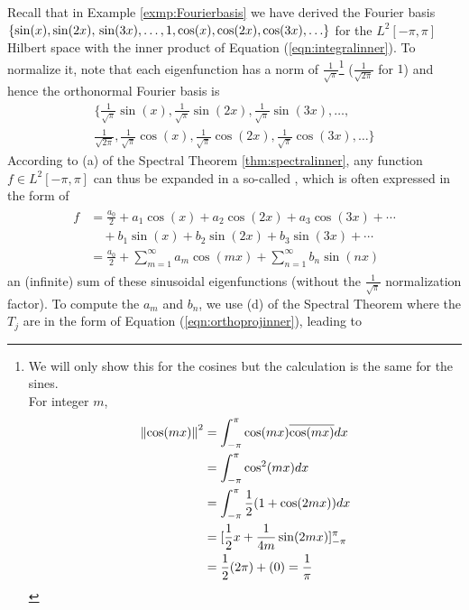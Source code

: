 Recall that in Example \ref{exmp:Fourierbasis} we have derived the Fourier basis $\{\sin(x), \sin(2x), \\ \sin(3x), \ldots, 1, \cos(x), \cos(2x), \cos(3x), \ldots\}$ for the $L^2[-\pi, \pi]$ Hilbert space with the inner product of Equation (\ref{eqn:integralinner}). To normalize it, note that each eigenfunction has a norm of $\frac{1}{\sqrt{\pi}}$\footnote{We will only show this for the cosines but the calculation is the same for the sines. \\For integer $m$,
\begin{align*}
\norm{\cos(mx)}^2 &= \int_{-\pi}^{\pi} \cos(mx)\overline{\cos(mx)} dx \\
&= \int_{-\pi}^{\pi} \cos^2(mx) dx \\
&= \int_{-\pi}^{\pi} \frac{1}{2}(1 + \cos(2mx)) dx \\
&= [\frac{1}{2}x + \frac{1}{4m}\sin(2mx)]_{-\pi}^{\pi} \\
&= \frac{1}{2}(2\pi) + (0) = \frac{1}{\pi}
\end{align*}
} ($\frac{1}{\sqrt{2\pi}}$ for $1$) and hence the orthonormal Fourier basis is 
\begin{align*}
\{\frac{1}{\sqrt{\pi}}\sin(x), \frac{1}{\sqrt{\pi}}\sin(2x), \frac{1}{\sqrt{\pi}}\sin(3x), \ldots, \\
\frac{1}{\sqrt{2\pi}}, \frac{1}{\sqrt{\pi}}\cos(x), \frac{1}{\sqrt{\pi}}\cos(2x), \frac{1}{\sqrt{\pi}}\cos(3x), \ldots\}    
\end{align*} According to (a) of the Spectral Theorem \ref{thm:spectralinner}, any function $f \in L^2[-\pi, \pi]$ can thus be expanded in a so-called , which is often expressed in the form of
\begin{align}
\begin{aligned}
f &= \frac{a_0}{2} + a_1\cos(x) + a_2\cos(2x) + a_3\cos(3x) + \cdots \\
&\quad + b_1\sin(x) + b_2\sin(2x) + b_3\sin(3x) + \cdots \\
&= \frac{a_0}{2} + \sum_{m=1}^{\infty} a_m \cos(mx) + \sum_{n=1}^{\infty} b_n \sin(nx) 
\end{aligned} \label{eqn:fourierseries}
\end{align}
an (infinite) sum of these sinusoidal eigenfunctions (without the $\frac{1}{\sqrt{\pi}}$ normalization factor). To compute the  $a_m$ and $b_n$, we use (d) of the Spectral Theorem where the $T_j$ are in the form of Equation (\ref{eqn:orthoprojinner}), leading to
